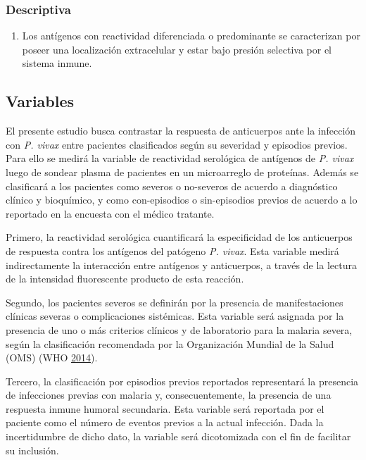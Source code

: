 \documentclass[a4paper]{article}
\providecommand{\tightlist}{%
  \setlength{\itemsep}{0pt}\setlength{\parskip}{0pt}}
\begin{document}
\subsubsection{Descriptiva}\label{descriptiva}

\begin{enumerate}
\def\labelenumi{\arabic{enumi}.}
\setcounter{enumi}{2}
\tightlist
\item
  Los antígenos con reactividad diferenciada o predominante se
  caracterizan por poseer una localización extracelular y estar bajo
  presión selectiva por el sistema inmune.
\end{enumerate}

\subsection{Variables}\label{variables}

El presente estudio busca contrastar la respuesta de anticuerpos ante la
infección con \emph{P. vivax} entre pacientes clasificados según su
severidad y episodios previos. Para ello se medirá la variable de
reactividad serológica de antígenos de \emph{P. vivax} luego de sondear
plasma de pacientes en un microarreglo de proteínas. Además se
clasificará a los pacientes como severos o no-severos de acuerdo a
diagnóstico clínico y bioquímico, y como con-episodios o sin-episodios
previos de acuerdo a lo reportado en la encuesta con el médico tratante.

Primero, la reactividad serológica cuantificará la especificidad de los
anticuerpos de respuesta contra los antígenos del patógeno \emph{P.
vivax}. Esta variable medirá indirectamente la interacción entre
antígenos y anticuerpos, a través de la lectura de la intensidad
fluorescente producto de esta reacción.

Segundo, los pacientes severos se definirán por la presencia de
manifestaciones clínicas severas o complicaciones sistémicas. Esta
variable será asignada por la presencia de uno o más criterios clínicos
y de laboratorio para la malaria severa, según la clasificación
recomendada por la Organización Mundial de la Salud (OMS) (WHO
\protect\hyperlink{ref-WHO2014severe}{2014}).

Tercero, la clasificación por episodios previos reportados representará
la presencia de infecciones previas con malaria y, consecuentemente, la
presencia de una respuesta inmune humoral secundaria. Esta variable será
reportada por el paciente como el número de eventos previos a la actual
infección. Dada la incertidumbre de dicho dato, la variable será
dicotomizada con el fin de facilitar su inclusión.
\end{document}
